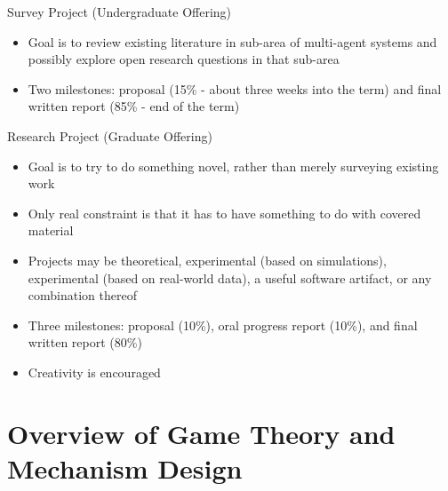 \documentclass[11pt,aspectratio=169,handout]{beamer}
\begin{document}
  \begin{frame}{Survey Project (Undergraduate Offering)}
   \begin{itemize}
   \setlength{\itemsep}{1em}
    \item Goal is to review existing literature in sub-area of multi-agent systems and possibly explore open research questions in that sub-area
    \item Two milestones: proposal (15\% - about three weeks into the term) and final written report (85\% - end of the term)
   \end{itemize}
  \end{frame}
 
  \begin{frame}{Research Project (Graduate Offering)}
   \begin{itemize}
   \setlength{\itemsep}{1em}
   \item Goal is to try to do something novel, rather than merely surveying existing work
   \item Only real constraint is that it has to have something to do with covered material
   \item Projects may be theoretical, experimental (based on simulations), experimental (based on real-world data), a useful software artifact, or any combination thereof
   \item Three milestones: proposal (10\%), oral progress report (10\%), and final written report (80\%)
   \item Creativity is encouraged
   \end{itemize}
  \end{frame}
 
 \section{Overview of Game Theory and Mechanism Design}
 
\end{document}
